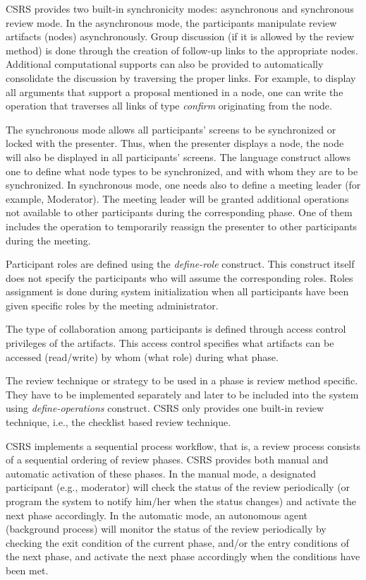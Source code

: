 CSRS provides two built-in synchronicity modes: asynchronous
and synchronous review mode. In the asynchronous mode, the
participants manipulate review artifacts (nodes) asynchronously.
Group discussion (if it is allowed by the review method) is done
through the creation of follow-up links to the appropriate nodes. 
Additional computational supports can
also be provided to automatically consolidate the discussion by 
traversing the proper links. For example, to display all arguments that
support a proposal mentioned in a node, one can write the operation
that traverses all links of type {\it confirm} originating from the
node. 

The synchronous mode allows all participants' screens to be
synchronized or locked with the presenter.
Thus, when the presenter displays a node, the node will also be
displayed in all participants' screens. 
The language construct allows one to define what node types to be
synchronized, and with whom they are to be synchronized. In
synchronous mode, one needs also to define a meeting leader (for
example, Moderator). The meeting leader will be granted additional 
operations not available to other participants during the
corresponding phase. One of them includes the operation to 
temporarily reassign the presenter to other participants during the
meeting. 

Participant roles are defined using the {\it define-role} construct. 
This construct itself does not specify the participants who will
assume the corresponding roles. Roles assignment is  done during system
initialization when all participants have been given specific
roles by the meeting administrator.

The type of collaboration among participants is defined through access
control privileges of the artifacts. This access control specifies
what artifacts can be 
accessed (read/write) by whom (what role) during what phase.

The review technique or strategy to be used in a phase is review
method specific. They have to be implemented
separately and later to be included into the system using {\it
define-operations} construct. 
CSRS only provides one built-in review technique, i.e., the
checklist based review technique.

CSRS implements a sequential process workflow, that is, a
review process consists of a sequential ordering of review phases.
CSRS provides both manual and automatic
activation of these phases. In the manual mode, a designated participant
(e.g., moderator) will check the status of the review periodically (or
program the system to notify him/her when the status changes) and activate
the next phase accordingly. In the automatic mode, an autonomous agent
(background process) will monitor the status of the review
periodically by checking the exit condition of the current phase, and/or
the entry conditions of the next phase, and activate the next phase
accordingly when the conditions have been met.

